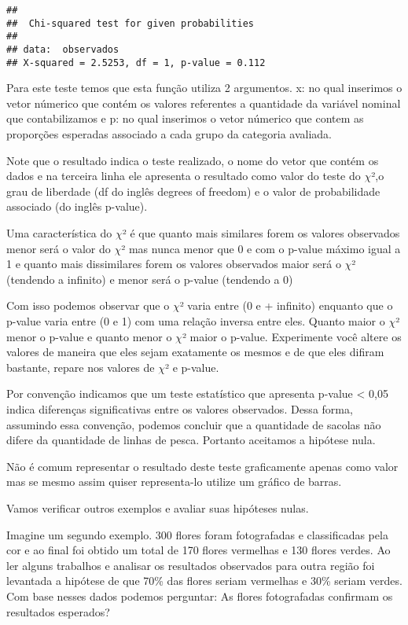 \documentclass[titlepage, oneside, openany, a4paper]{book}
\begin{document}
\begin{verbatim}
## 
##  Chi-squared test for given probabilities
## 
## data:  observados
## X-squared = 2.5253, df = 1, p-value = 0.112
\end{verbatim}

Para este teste temos que esta função utiliza 2 argumentos. x: no qual inserimos o vetor númerico que contém os valores referentes a quantidade da variável nominal que contabilizamos e p: no qual inserimos o vetor númerico que contem as proporções esperadas associado a cada grupo da categoria avaliada.

Note que o resultado indica o teste realizado, o nome do vetor que contém os dados e na terceira linha ele apresenta o resultado como valor do teste do \(\chi\)²,o grau de liberdade (df do inglês degrees of freedom) e o valor de probabilidade associado (do inglês p-value).

Uma característica do \(\chi\)² é que quanto mais similares forem os valores observados menor será o valor do \(\chi\)² mas nunca menor que 0 e com o p-value máximo igual a 1 e quanto mais dissimilares forem os valores observados maior será o \(\chi\)² (tendendo a infinito) e menor será o p-value (tendendo a 0)

Com isso podemos observar que o \(\chi\)² varia entre (0 e + infinito) enquanto que o p-value varia entre (0 e 1) com uma relação inversa entre eles. Quanto maior o \(\chi\)² menor o p-value e quanto menor o \(\chi\)² maior o p-value. Experimente você altere os valores de maneira que eles sejam exatamente os mesmos e de que eles difiram bastante, repare nos valores de \(\chi\)² e p-value.

Por convenção indicamos que um teste estatístico que apresenta p-value \textless{} 0,05 indica diferenças significativas entre os valores observados. Dessa forma, assumindo essa convenção, podemos concluir que a quantidade de sacolas não difere da quantidade de linhas de pesca. Portanto aceitamos a hipótese nula.

Não é comum representar o resultado deste teste graficamente apenas como valor mas se mesmo assim quiser representa-lo utilize um gráfico de barras.

Vamos verificar outros exemplos e avaliar suas hipóteses nulas.

Imagine um segundo exemplo. 300 flores foram fotografadas e classificadas pela cor e ao final foi obtido um total de 170 flores vermelhas e 130 flores verdes. Ao ler alguns trabalhos e analisar os resultados observados para outra região foi levantada a hipótese de que 70\% das flores seriam vermelhas e 30\% seriam verdes. Com base nesses dados podemos perguntar: As flores fotografadas confirmam os resultados esperados?
\end{document}
